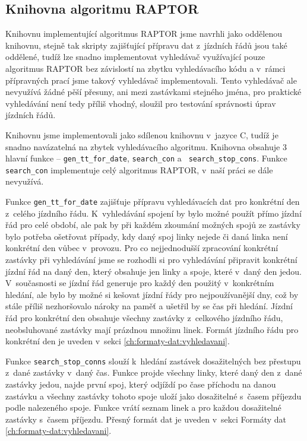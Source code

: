 \subsection{Knihovna algoritmu RAPTOR}
Knihovnu implementující algoritmus RAPTOR jsme navrhli jako oddělenou knihovnu,
stejně tak skripty zajišťující přípravu dat z~jízdních řádů jsou také oddělené,
tudíž lze snadno implementovat vyhledávač využívající pouze algoritmus RAPTOR
bez závislostí na zbytku vyhledávacího kódu a v~rámci přípravných prací jsme
takový vyhledávač implementovali. Tento vyhledávač ale
nevyužívá žádné pěší přesuny, ani mezi zastávkami stejného jména, pro praktické
vyhledávání není tedy příliš vhodný, sloužil pro testování správnosti úprav
jízdních řádů.

Knihovnu jsme implementovali jako sdílenou knihovnu v~jazyce C, tudíž je snadno
navázatelná na zbytek vyhledávacího algoritmu. Knihovna obsahuje 3 hlavní
funkce -- {\tt gen\_tt\_for\_date}, {\tt search\_con} a {\tt
search\_stop\_cons}. Funkce {\tt search\_con} implementuje celý algoritmus
RAPTOR, v~naší práci se dále nevyužívá.

Funkce {\tt gen\_tt\_for\_date} zajišťuje přípravu vyhledávacích dat pro
konkrétní den z~celého jízdního řádu. K~vyhledávání spojení by bylo možné použít
přímo jízdní řád pro celé období, ale pak by při každém zkoumání možných spojů
ze zastávky bylo potřeba ošetřovat případy, kdy daný spoj linky nejede či daná
linka není konkrétní den vůbec v~provozu. Pro co nejjednodušší zpracování
konkrétní zastávky při vyhledávání jsme se rozhodli si pro vyhledávání připravit
konkrétní jízdní řád na daný den, který obsahuje jen linky a spoje, které v~daný
den jedou. V~současnosti se jízdní řád generuje pro každý den použitý
v~konkrétním hledání, ale bylo by možné si kešovat jízdní řády pro nejpoužívanější
dny, což by stále příliš nezhoršovalo nároky na paměť a ušetřil by se čas při
hledání. Jízdní řád pro konkrétní den obsahuje všechny zastávky z~celkového
jízdního řádu, neobsluhované zastávky mají prázdnou množinu linek. Formát
jízdního řádu pro konkrétní den je uveden v~sekci \ref{ch:formaty-dat:vyhledavani}.

Funkce {\tt search\_stop\_conns} slouží k~hledání zastávek dosažitelných bez
přestupu z~dané zastávky v~daný čas. Funkce projde všechny linky, které daný den
z~dané zastávky jedou, najde první spoj, který odjíždí po čase příchodu na danou
zastávku a všechny zastávky tohoto spoje uloží jako dosažitelné s~časem příjezdu
podle nalezeného spoje. Funkce vrátí seznam linek a pro každou dosažitelné
zastávky s~časem příjezdu. Přesný formát dat je uveden v~sekci Formáty dat
\ref{ch:formaty-dat:vyhledavani}.

